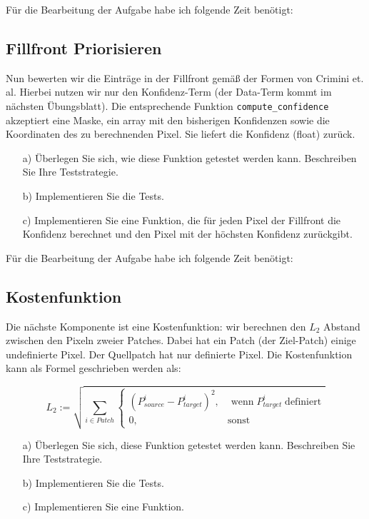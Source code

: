 Für die Bearbeitung der Aufgabe habe ich folgende Zeit benötigt:

\subsection{Fillfront Priorisieren}

Nun bewerten wir die Einträge in der Fillfront gemäß der Formen von Crimini et. al. Hierbei nutzen wir nur den Konfidenz-Term (der Data-Term kommt im nächsten Übungsblatt). Die entsprechende Funktion \texttt{compute\_confidence} akzeptiert eine Maske,  ein array mit den bisherigen Konfidenzen sowie die Koordinaten des zu berechnenden Pixel. Sie liefert die Konfidenz (float) zurück.

\begin{enumerate}

\item[a)] Überlegen Sie sich, wie diese Funktion getestet werden kann. Beschreiben Sie Ihre Teststrategie.

\item[b)] Implementieren Sie die Tests. 

\item[c)] Implementieren Sie eine Funktion, die für jeden Pixel der Fillfront die Konfidenz berechnet und den Pixel mit der höchsten Konfidenz zurückgibt. 

\end{enumerate}

Für die Bearbeitung der Aufgabe habe ich folgende Zeit benötigt:

\subsection{Kostenfunktion}

Die nächste Komponente ist eine Kostenfunktion: wir berechnen den $L_2$ Abstand zwischen den Pixeln zweier Patches. Dabei hat ein Patch (der Ziel-Patch) einige undefinierte Pixel. Der Quellpatch hat nur definierte Pixel. Die Kostenfunktion kann als Formel geschrieben werden als:

$$L_2 := \sqrt{ \sum_{i \in Patch} \begin{cases} (P_{source}^i - P_{target}^i)^2, &\text{ wenn} \; P_{target}^i \; \text{definiert} \\ 0,&\text{sonst} \end{cases}}$$

\begin{enumerate}

\item[a)] Überlegen Sie sich, diese Funktion getestet werden kann. Beschreiben Sie Ihre Teststrategie.

\item[b)] Implementieren Sie die Tests. 

\item[c)] Implementieren Sie eine Funktion. 

\end{enumerate}

